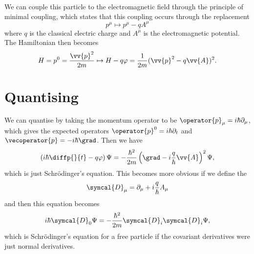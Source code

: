 \documentclass[fleqn]{NotesClass}
\newcommand{\covariantDerivative}{\symcal{D}}
\begin{document}
    We can couple this particle to the electromagnetic field through the principle of minimal coupling, which states that this coupling occurs through the replacement
    \begin{equation}
        p^\mu \mapsto p^\mu - q A^\mu
    \end{equation}
    where \(q\) is the classical electric charge and \(A^\mu\) is the electromagnetic potential.
    The Hamiltonian then becomes
    \begin{equation}
        H = p^0 = \frac{\vv{p}^2}{2m} \mapsto H - q\varphi = \frac{1}{2m}(\vv{p}^2 - q\vv{A})^2.
    \end{equation}
    
    \section{Quantising}
    We can quantise by taking the momentum operator to be \(\operator{p}_\mu = i\hbar \partial_\mu\), which gives the expected operators \(\operator{p}^0 = i\hbar \partial_t\) and \(\vecoperator{p} = -i\hbar\grad\).
    Then we have
    \begin{equation}
        \left( i\hbar\diffp{}{t} - q\varphi \right) \Psi = -\frac{\hbar^2}{2m}\left( \grad - i\frac{q}{\hbar}\vv{A} \right)^2 \Psi,
    \end{equation}
    which is just Schrödinger's equation.
    This becomes more obvious if we define the 
    \begin{equation}
        \covariantDerivative_\mu = \partial_\mu + i\frac{q}{\hbar}A_\mu
    \end{equation}
    and then this equation becomes
    \begin{equation}
        i\hbar \covariantDerivative_0\Psi = -\frac{\hbar^2}{2m}\covariantDerivative_i \covariantDerivative_i \Psi,
    \end{equation}
    which is Schrödinger's equation for a free particle if the covariant derivatives were just normal derivatives.
    
\end{document}
